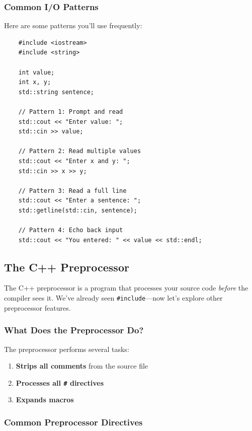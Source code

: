 \subsubsection{Common I/O Patterns}

Here are some patterns you'll use frequently:

\begin{lstlisting}
	#include <iostream>
	#include <string>

	int value;
	int x, y;
	std::string sentence;

	// Pattern 1: Prompt and read
	std::cout << "Enter value: ";
	std::cin >> value;

	// Pattern 2: Read multiple values
	std::cout << "Enter x and y: ";
	std::cin >> x >> y;

	// Pattern 3: Read a full line
	std::cout << "Enter a sentence: ";
	std::getline(std::cin, sentence);

	// Pattern 4: Echo back input
	std::cout << "You entered: " << value << std::endl;
\end{lstlisting}

\subsection{The C++ Preprocessor}

The C++ preprocessor is a program that processes your source code \textit{before} the compiler sees it. We've already seen \texttt{\#include}—now let's explore other preprocessor features.

\subsubsection{What Does the Preprocessor Do?}

The preprocessor performs several tasks:

\begin{enumerate}
	\item \textbf{Strips all comments} from the source file
	\item \textbf{Processes all \texttt{\#} directives}
	\item \textbf{Expands macros}
\end{enumerate}

\subsubsection{Common Preprocessor Directives}

